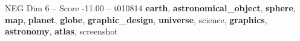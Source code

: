 \begin{textsample}{NEG Dim 6 – Score -11.00 – t010814}  \label{ex:f6_neg_011}
\textbf{earth}, \textbf{astronomical\_object}, \textbf{sphere}, \textbf{map}, \textbf{planet}, \textbf{globe}, \textbf{graphic\_design}, \textbf{universe}, science, \textbf{graphics}, \textbf{astronomy}, \textbf{atlas}, screenshot

\end{textsample}
